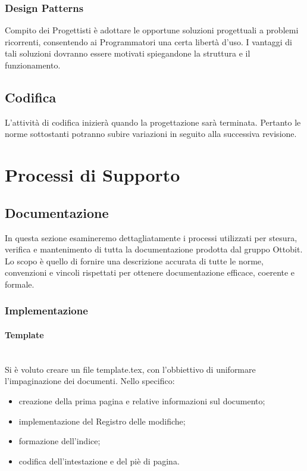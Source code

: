 \documentclass[11pt,a4paper]{article}
\begin{document}
	\subsubsection{Design Patterns} Compito dei Progettisti è adottare le opportune soluzioni progettuali a problemi ricorrenti, consentendo ai Programmatori una certa libertà d'uso. I vantaggi di tali soluzioni dovranno essere motivati spiegandone la struttura e il funzionamento.
	
	\subsection{Codifica}
	L'attività di codifica inizierà quando la progettazione sarà terminata. Pertanto
	le norme sottostanti potranno subire variazioni in seguito alla successiva revisione.

	
	\newpage
	\section{Processi di Supporto}
	
	\subsection{Documentazione}
	In questa sezione esamineremo dettagliatamente i processi utilizzati per stesura, verifica e mantenimento di tutta la documentazione prodotta dal gruppo Ottobit.
	Lo scopo è quello di fornire una descrizione accurata di tutte le norme, convenzioni e vincoli rispettati per ottenere documentazione efficace, coerente e formale.
	\subsubsection{Implementazione}
	
	\paragraph{Template}
	\noindent \\ 
	Si è voluto creare un file template.tex, con l'obbiettivo di uniformare l'impaginazione dei documenti. 
	Nello specifico:
	\begin{itemize}
		\item{creazione della prima pagina e relative informazioni sul documento;}
		\item{implementazione del Registro delle modifiche;}
		\item{formazione dell'indice;}
		\item {codifica dell'intestazione e del piè di pagina.}
		
	\end{itemize}
\end{document}
